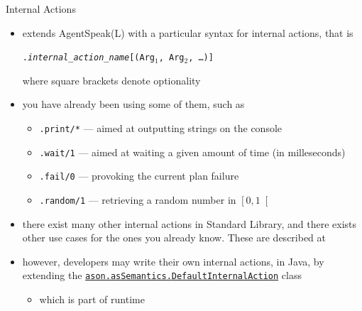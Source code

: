 \documentclass[presentation]{beamer}\mode<presentation>{\usetheme{AMSBolognaFC}}
\begin{document}
\begin{frame}[c, allowframebreaks]{\jason{} Internal Actions}
    \begin{itemize}
        \item \jason{} extends AgentSpeak(L) with a particular syntax for \alert{internal actions}, that is
        \begin{center}
            \texttt{\alert{.}\textit{internal\_action\_name}\alert{[}(Arg$_1$, Arg$_2$, \ldots)\alert{]}}
        \end{center}
        where square brackets denote optionality
        
        \vspace{.3cm}
        
        \item you have already been using some of them, such as
        \begin{itemize}
            \item \texttt{\alert{.print}/*} --- aimed at outputting strings on the console
            \item \texttt{\alert{.wait}/1} --- aimed at waiting a given amount of time (in milleseconds)
            \item \texttt{\alert{.fail}/0} --- provoking the current plan failure
            \item \texttt{\alert{.random}/1} --- retrieving a random number in $\left[ 0, 1 \right[$
        \end{itemize}
        
        \vspace{.3cm}
        
        \item there exist many other internal actions in \jason{} Standard Library, and there exists other use cases for the ones you already know.
        These are described at
        \begin{center}
        \end{center}
    
        \vspace{.3cm}
        
        \item however, developers may write their own internal actions, in Java, by extending the \href{http://jason.sourceforge.net/api/jason/asSemantics/DefaultInternalAction.html}{\texttt{ason.asSemantics.\alert{DefaultInternalAction}}} class
        \begin{itemize}
            \item which is part of \jason{} runtime
        \end{itemize}
    

\end{itemize}
\end{frame}
\end{document}
